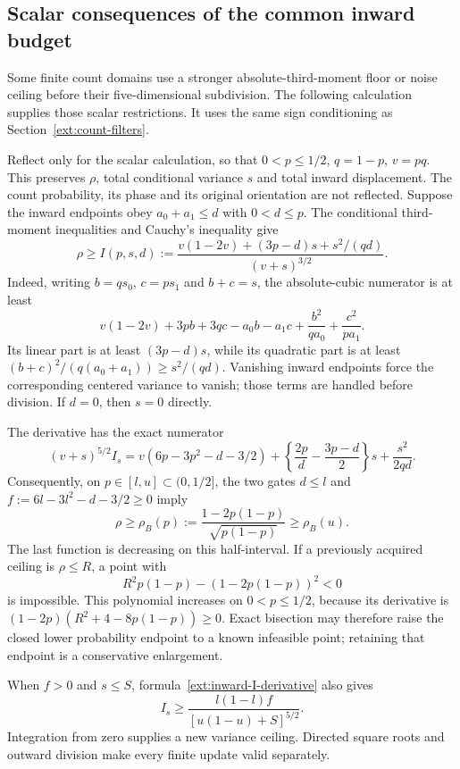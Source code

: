 \subsection{Scalar consequences of the common inward budget}
\label{ext:inward-scalar}
Some finite count domains use a stronger absolute-third-moment floor or
noise ceiling before their five-dimensional subdivision. The following
calculation supplies those scalar restrictions. It uses the same sign
conditioning as Section~\ref{ext:count-filters}.

Reflect only for the scalar calculation, so that
$0<p\le1/2$, $q=1-p$, $v=pq$. This preserves $\rho$, total
conditional variance $s$ and total inward displacement. The count
probability, its phase and its original orientation are not reflected.
Suppose the inward endpoints obey $a_0+a_1\le d$ with $0<d\le p$.
The conditional third-moment inequalities and Cauchy's inequality give
\begin{equation}\label{ext:inward-I}
 \rho\ge I(p,s,d):=
 \frac{v(1-2v)+(3p-d)s+s^2/(qd)}{(v+s)^{3/2}}.
\end{equation}
Indeed, writing $b=qs_0$, $c=ps_1$ and $b+c=s$, the absolute-cubic
numerator is at least
\[
 v(1-2v)+3pb+3qc-a_0b-a_1c
                       +\frac{b^2}{qa_0}+\frac{c^2}{pa_1}.
\]
Its linear part is at least $(3p-d)s$, while its quadratic part is
at least $(b+c)^2/(q(a_0+a_1))\ge s^2/(qd)$.
Vanishing inward endpoints force the corresponding centered variance
to vanish; those terms are handled before division. If $d=0$, then
$s=0$ directly.

The derivative has the exact numerator
\begin{equation}\label{ext:inward-I-derivative}
 (v+s)^{5/2}I_s
 =v(6p-3p^2-d-3/2)
   +\left\{\frac{2p}{d}-\frac{3p-d}{2}\right\}s
   +\frac{s^2}{2qd}.
\end{equation}
Consequently, on $p\in[l,u]\subset(0,1/2]$, the two gates
$d\le l$ and $f:=6l-3l^2-d-3/2\ge0$ imply
\[
 \rho\ge\rho_B(p):=\frac{1-2p(1-p)}{\sqrt{p(1-p)}}
                  \ge\rho_B(u).
\]
The last function is decreasing on this half-interval. If a previously
acquired ceiling is $\rho\le R$, a point with
\[
 R^2p(1-p)-(1-2p(1-p))^2<0
\]
is impossible. This polynomial increases on $0<p\le1/2$, because
its derivative is $(1-2p)(R^2+4-8p(1-p))\ge0$.
Exact bisection may therefore raise the closed lower probability
endpoint to a known infeasible point; retaining that endpoint is a
conservative enlargement.

When $f>0$ and $s\le S$, formula~\eqref{ext:inward-I-derivative}
also gives
\[
 I_s\ge
 \frac{l(1-l)f}{[u(1-u)+S]^{5/2}}.
\]
Integration from zero supplies a new variance ceiling. Directed square
roots and outward division make every finite update valid separately.

